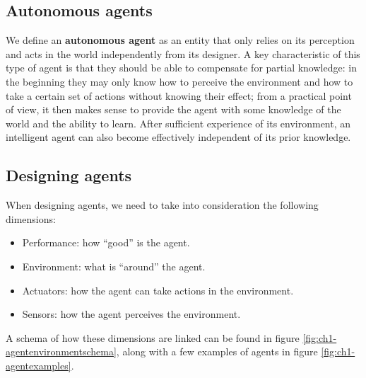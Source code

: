 \subsection{Autonomous agents}
We define an \textbf{autonomous agent} as an entity that only relies on its perception and acts in the world independently from its designer. A key characteristic of this type of agent is that they should be able to compensate for partial knowledge: in the beginning they may only know how to perceive the environment and how to take a certain set of actions without knowing their effect; from a practical point of view, it then makes sense to provide the agent with some knowledge of the world and the ability to learn. After sufficient experience of its environment, an intelligent agent can also become effectively independent of its prior knowledge.

\subsection{Designing agents}
When designing agents, we need to take into consideration the following dimensions:

\begin{itemize}
    \item Performance: how ``good'' is the agent.
    \item Environment: what is ``around'' the agent.
    \item Actuators: how the agent can take actions in the environment.
    \item Sensors: how the agent perceives the environment.
\end{itemize}

A schema of how these dimensions are linked can be found in figure \ref{fig:ch1-agentenvironmentschema}, along with a few examples of agents in figure \ref{fig:ch1-agentexamples}.

